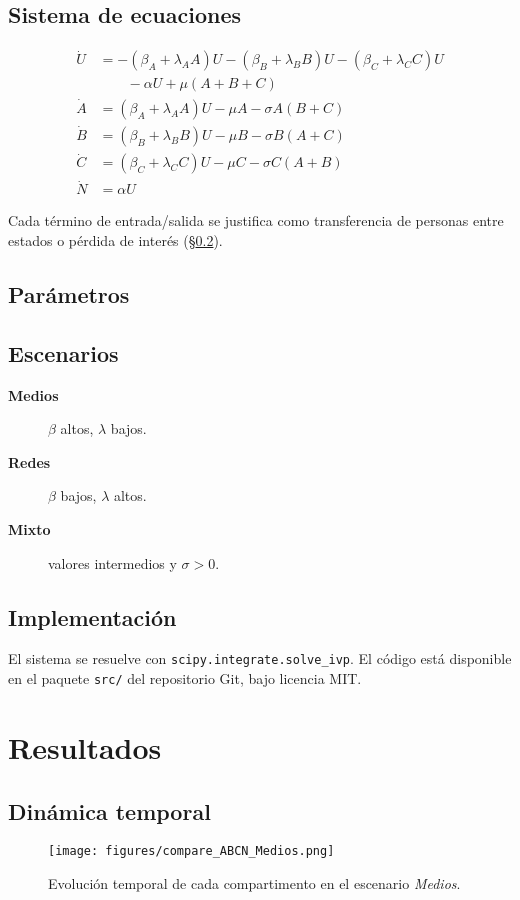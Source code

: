 \documentclass[12pt,a4paper]{article}
\begin{document}
\subsection{Sistema de ecuaciones}
\[
\begin{aligned}
\dot U &= -(\beta_A+\lambda_A A)U-(\beta_B+\lambda_B B)U-(\beta_C+\lambda_C C)U \\
       &\qquad -\alpha U + \mu(A+B+C) \\[4pt]
\dot A &= (\beta_A+\lambda_A A)U-\mu A-\sigma A(B+C) \\[2pt]
\dot B &= (\beta_B+\lambda_B B)U-\mu B-\sigma B(A+C) \\[2pt]
\dot C &= (\beta_C+\lambda_C C)U-\mu C-\sigma C(A+B) \\[2pt]
\dot N &= \alpha U
\end{aligned}
\]

Cada término de entrada/salida se justifica como transferencia de personas entre estados o pérdida de interés (\S\ref{sec:param}).

\subsection{Parámetros}
\label{sec:param}


\subsection{Escenarios}
\begin{description}
  \item[\textbf{Medios}] $\beta$ altos,  $\lambda$ bajos.
  \item[\textbf{Redes}] $\beta$ bajos,  $\lambda$ altos.
  \item[\textbf{Mixto}] valores intermedios y $\sigma>0$.
\end{description}

\subsection{Implementación}
El sistema se resuelve con \texttt{scipy.integrate.solve\_ivp}.
El código está disponible en el paquete \texttt{src/} del repositorio Git, bajo licencia MIT.

\section{Resultados}

\subsection{Dinámica temporal}
\begin{figure}[ht]
   \centering
   \texttt{[image: figures/compare\_ABCN\_Medios.png]}
   \caption{Evolución temporal de cada compartimento en el escenario \emph{Medios}.}
\end{figure}
\end{document}
